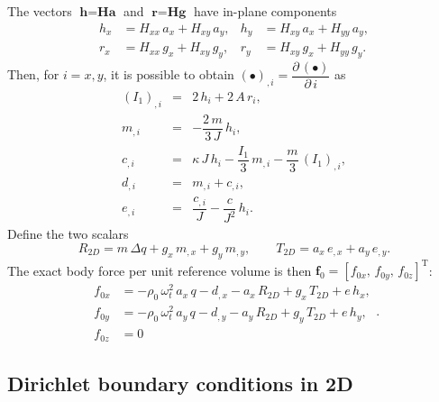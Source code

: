 \documentclass[11pt,a4paper]{article}
\begin{document}
The vectors $\textbf{h}=\textbf{H}\textbf{a}$ and $\textbf{r}=\textbf{H}\textbf{g}$ have in-plane components
%
\begin{align}
h_x&=H_{xx}\,a_x+H_{xy}\,a_y,
&h_y&=H_{xy}\,a_x+H_{yy}\,a_y,
\\
r_x&=H_{xx}\,g_x+H_{xy}\,g_y,
&r_y&=H_{xy}\,g_x+H_{yy}\,g_y.
\end{align}
%
Then, for $i=x,y$, it is possible to obtain $(\bullet)_{,i}=\dfrac{\partial\,(\bullet)}{\partial\,i}$ as
%
\begin{eqnarray}
(I_1)_{,i}&=&2\,h_i+2\,A\,r_i,
\\
m_{,i}&=&-\dfrac{2\,m}{3\,J}\,h_i,
\\
c_{,i}&=&\kappa \,J\,h_i-\dfrac{I_1}{3}\,m_{,i}
-\dfrac{m}{3}\,(I_1)_{,i},
\\
d_{,i}&=&m_{,i}+c_{,i},
\\
e_{,i}&=&\dfrac{c_{,i}}{J}-\dfrac{c}{J^2}\,h_i.
\end{eqnarray}
%
Define the two scalars
%
\begin{equation}
\boxed{
R_{2D}=m\,\Delta q+g_x\,m_{,x}+g_y\,m_{,y},
\qquad
T_{2D}=a_x\,e_{,x}+a_y\,e_{,y}
}.
\end{equation}
%
The exact body force per unit reference volume is then $\textbf{f}_0=[f_{0x},\,f_{0y},\,f_{0z}]^\text{T}$:
%
\begin{equation}
\boxed{
\begin{aligned}
f_{0x}&=-\rho_0\,\omega_t^2\,a_x\,q-d_{,x}-a_x\,R_{2D}+g_x\,T_{2D}+e\,h_x,
\\
f_{0y}&=-\rho_0\,\omega_t^2\,a_y\,q-d_{,y}-a_y\,R_{2D}+g_y\,T_{2D}+e\,h_y,
\\
f_{0z}&=0
\end{aligned}
}.
\label{eq_f2D}
\end{equation}

\subsection{Dirichlet boundary conditions in 2D}
\end{document}
